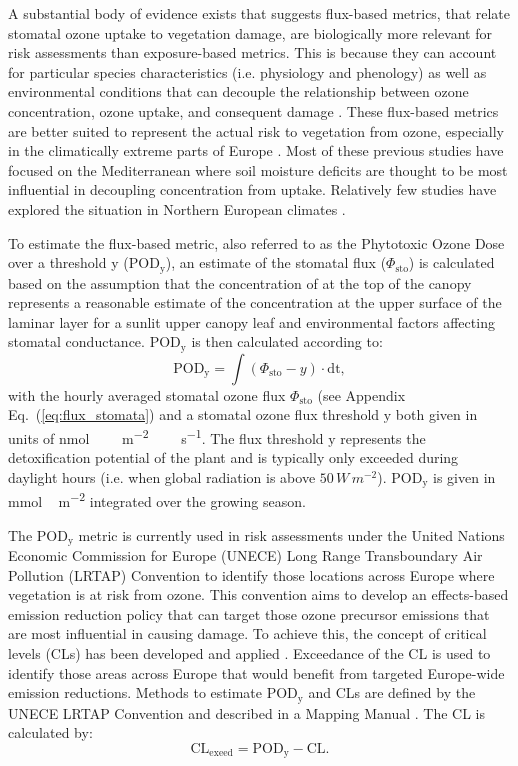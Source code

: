 \documentclass[bg, manuscript]{copernicus}
\begin{document}
A substantial body of evidence exists that suggests flux-based metrics, that relate stomatal ozone uptake to vegetation damage, are biologically more relevant for risk assessments than exposure-based metrics. This is because they can account for particular species characteristics (i.e. physiology and phenology) as well as environmental conditions that can decouple the relationship between ozone concentration, ozone uptake, and consequent damage \citep{PT:Emberson2020}. These flux-based metrics are better suited to represent the actual risk to vegetation from ozone, especially in the climatically extreme parts of Europe \citep{EP:Simpson2007,GCB:Mills2011,ICP:MappingManual2017}. Most of these previous studies have focused on the Mediterranean where soil moisture deficits are thought to be most influential in decoupling concentration from uptake. Relatively few studies have explored the situation in Northern European climates \citep[e.g.][]{iF:Juran2018}.

To estimate the flux-based metric, also referred to as the Phytotoxic Ozone Dose over a threshold y ($\mathrm{POD_y}$), an estimate of the stomatal  flux ($\Phi_\mathrm{sto}$) is calculated based on the assumption that the concentration of  at the top of the canopy represents a reasonable estimate of the concentration at the upper surface of the laminar layer for a sunlit upper canopy leaf and environmental factors affecting stomatal conductance. $\mathrm{POD_y}$ is then calculated according to:
%
\begin{equation}
  \mathrm{POD_y} = \int{(\Phi_\mathrm{sto}-y)\cdot \mathrm{dt}},
  \label{eq:pod}
\end{equation}
%
with the hourly averaged stomatal ozone flux $\Phi_\mathrm{sto}$ (see Appendix Eq.~(\ref{eq:flux_stomata}) and a stomatal ozone flux threshold $\mathrm{y}$ both given in units of \unit{nmol\,\,m^{-2}\,\,s^{-1}}. The flux threshold $\mathrm{y}$ represents the detoxification potential of the plant and is typically only exceeded during daylight hours (i.e. when global radiation is above $50\,\unit{W\,m^{-2}}$). $\mathrm{POD_y}$ is given in \unit{mmol\,m^{-2}} integrated over the growing season.

The $\mathrm{POD_y}$ metric is currently used in risk assessments under the United Nations Economic Commission for Europe (UNECE) Long Range Transboundary Air Pollution (LRTAP) Convention to identify those locations across Europe where vegetation is at risk from ozone. This convention aims to develop an effects-based emission reduction policy that can target those ozone precursor emissions that are most influential in causing damage. To achieve this, the concept of critical levels (CLs) has been developed and applied \citep{Maas2016}. Exceedance of the CL is used to identify those areas across Europe that would benefit from targeted Europe-wide emission reductions. Methods to estimate $\mathrm{POD_y}$ and CLs are defined by the UNECE LRTAP Convention and described in a Mapping Manual \citep{ICP:MappingManual2017}. The CL is calculated by: 
%
\begin{equation}
  \mathrm{CL_{exeed}} = \mathrm{POD_y} - \mathrm{CL}.
\end{equation}
%
\end{document}

